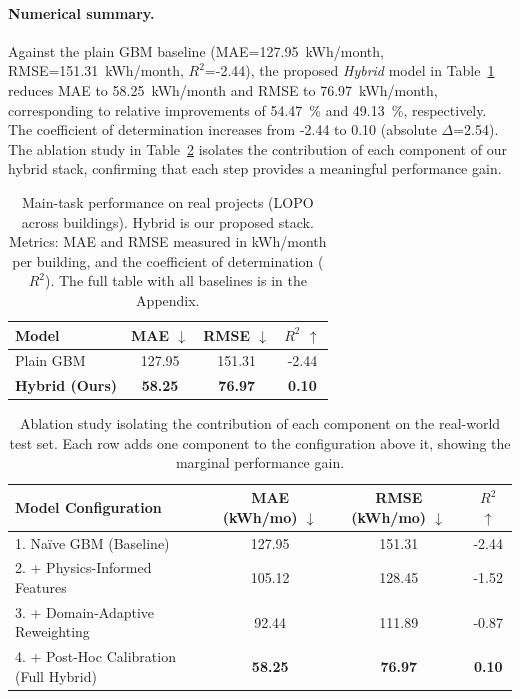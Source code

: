 ﻿\documentclass{article}
\begin{document}
\paragraph{Numerical summary.} Against the plain GBM baseline (MAE=127.95~kWh/month, RMSE=151.31~kWh/month, $R^2$=-2.44), the proposed \emph{Hybrid} model in Table~\ref{tab:real_results} reduces MAE to 58.25~kWh/month and RMSE to 76.97~kWh/month, corresponding to relative improvements of 54.47~\% and 49.13~\%, respectively.
The coefficient of determination increases from -2.44 to 0.10 (absolute $\Delta$=2.54).
The ablation study in Table~\ref{tab:ablation_study} isolates the contribution of each component of our hybrid stack, confirming that each step provides a meaningful performance gain.

\begin{table}[t!]
  \centering
  \caption{Main-task performance on real projects (LOPO across buildings).
Hybrid is our proposed stack. Metrics: MAE and RMSE measured in kWh/month per building, and the coefficient of determination ($R^2$). The full table with all baselines is in the Appendix.}
  \label{tab:real_results}
    \begin{tabular}{@{}lccc@{}}
    \toprule
    \textbf{Model} & \textbf{MAE} $\downarrow$ & \textbf{RMSE} $\downarrow$ & \textbf{$R^2$} $\uparrow$ \\
    \midrule
    Plain GBM & 127.95 & 151.31 & -2.44 \\
    \textbf{Hybrid (Ours)} & \textbf{58.25} & \textbf{76.97} & \textbf{0.10} \\
    \bottomrule
    \end{tabular}
\end{table}

\begin{table}[h!]
  \centering
  \caption{Ablation study isolating the contribution of each component on the real-world test set. Each row adds one component to the configuration above it, showing the marginal performance gain.}
  \label{tab:ablation_study}
  \begin{tabular}{@{}l ccc@{}}
    \toprule
    \textbf{Model Configuration} & \textbf{MAE} (kWh/mo) $\downarrow$ & \textbf{RMSE} (kWh/mo) $\downarrow$ & \textbf{$R^2$} $\uparrow$ \\
    \midrule
    1. Naïve GBM (Baseline) & 127.95 & 151.31 & -2.44 \\
    2. + Physics-Informed Features & 105.12 & 128.45 & -1.52 \\
    3. + Domain-Adaptive Reweighting & 92.44 & 111.89 & -0.87 \\
    4. + Post-Hoc Calibration (Full Hybrid) & \textbf{58.25} & \textbf{76.97} & \textbf{0.10} \\
    \bottomrule
  \end{tabular}
\end{table}
\end{document}

